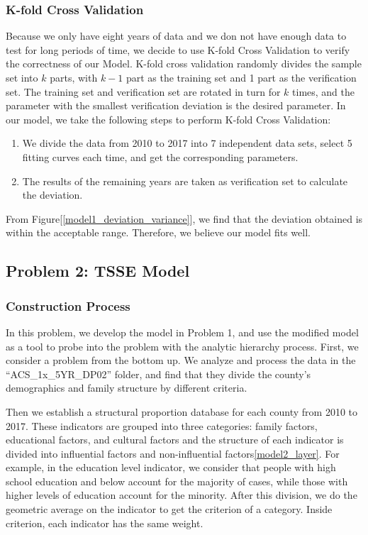 \documentclass{mcmthesis}
\begin{document}
\subsubsection{K-fold Cross Validation}
Because we only have eight years of data and we don not have enough data to test for long periods of time, we decide to use K-fold Cross Validation to verify the correctness of our Model\cite{6}. K-fold cross validation randomly divides the sample set into $k$ parts, with $k-1$ part as the training set and 1 part as the verification set. The training set and verification set are rotated in turn for $k$ times, and the parameter with the smallest verification deviation is the desired parameter. In our model, we take the following steps to perform K-fold Cross Validation:
\begin{enumerate}
	\item We divide the data from 2010 to 2017 into 7 independent data sets, select 5 fitting curves each time, and get the corresponding parameters.
	\item The results of the remaining years are taken as verification set to calculate the deviation.
\end{enumerate}

From Figure[\ref{model1_deviation_variance}], we find that the deviation obtained is within the acceptable range. Therefore, we believe our model fits well.

\subsection{Problem 2: TSSE Model}
\subsubsection{Construction Process}
In this problem, we develop the model in Problem 1, and use the modified model as a tool to probe into the problem with the analytic hierarchy process\cite{7}. First, we consider a problem from the bottom up. We analyze and process the data in the ``ACS\_1x\_5YR\_DP02'' folder, and find that they divide the county's demographics and family structure by different criteria.


 Then we establish a structural proportion database for each county from 2010 to 2017. These indicators are grouped into three categories\cite{8}: family factors, educational factors, and cultural factors and the structure of each indicator is divided into influential factors and non-influential factors\ref{model2_layer}. For example, in the education level indicator, we consider that people with high school education and below account for the majority of cases, while those with higher levels of education account for the minority. After this division, we do the geometric average on the indicator to get the criterion of a category. Inside criterion, each indicator has the same weight.
 
\end{document}
